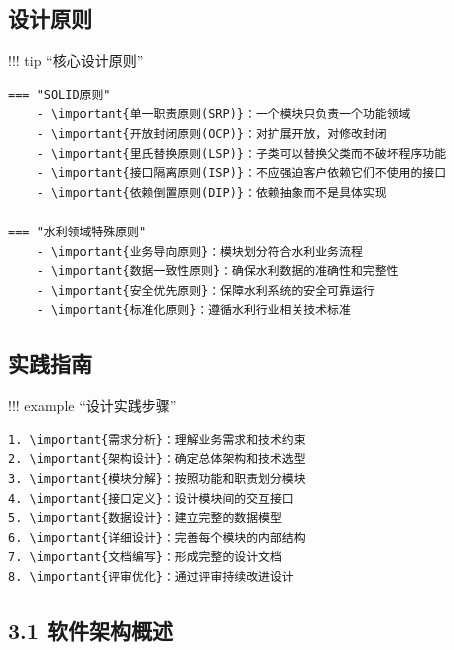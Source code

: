 
\hypertarget{ux8bbeux8ba1ux539fux5219}{%
\subsection{设计原则}\label{ux8bbeux8ba1ux539fux5219}}

!!! tip ``核心设计原则''

\begin{verbatim}
=== "SOLID原则"
    - \important{单一职责原则(SRP)}：一个模块只负责一个功能领域
    - \important{开放封闭原则(OCP)}：对扩展开放，对修改封闭
    - \important{里氏替换原则(LSP)}：子类可以替换父类而不破坏程序功能
    - \important{接口隔离原则(ISP)}：不应强迫客户依赖它们不使用的接口
    - \important{依赖倒置原则(DIP)}：依赖抽象而不是具体实现
    
=== "水利领域特殊原则"
    - \important{业务导向原则}：模块划分符合水利业务流程
    - \important{数据一致性原则}：确保水利数据的准确性和完整性
    - \important{安全优先原则}：保障水利系统的安全可靠运行
    - \important{标准化原则}：遵循水利行业相关技术标准
\end{verbatim}

\hypertarget{ux5b9eux8df5ux6307ux5357}{%
\subsection{实践指南}\label{ux5b9eux8df5ux6307ux5357}}

!!! example ``设计实践步骤''

\begin{verbatim}
1. \important{需求分析}：理解业务需求和技术约束
2. \important{架构设计}：确定总体架构和技术选型
3. \important{模块分解}：按照功能和职责划分模块
4. \important{接口定义}：设计模块间的交互接口
5. \important{数据设计}：建立完整的数据模型
6. \important{详细设计}：完善每个模块的内部结构
7. \important{文档编写}：形成完整的设计文档
8. \important{评审优化}：通过评审持续改进设计
\end{verbatim}

\hypertarget{ux8f6fux4ef6ux67b6ux6784ux6982ux8ff0}{%
\subsection{3.1 软件架构概述}\label{ux8f6fux4ef6ux67b6ux6784ux6982ux8ff0}}

